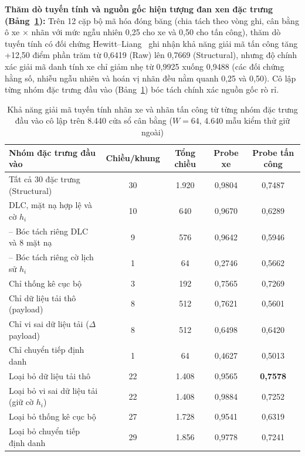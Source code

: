 \documentclass[12pt, a4paper, reqno, oneside]{book}
\begin{document}
\textbf{Thăm dò tuyến tính và nguồn gốc hiện tượng đan xen đặc trưng (Bảng~\ref{tab:input-probes}):} Trên 12 cặp bộ mã hóa đóng băng (chia tách theo vòng ghi, cân bằng ô xe $\times$ nhãn với mức ngẫu nhiên 0,25 cho xe và 0,50 cho tấn công), thăm dò tuyến tính có đối chứng Hewitt--Liang~\cite{hewitt2019probes} ghi nhận khả năng giải mã tấn công tăng +12,50 điểm phần trăm từ 0,6419 (Raw) lên 0,7669 (Structural), nhưng độ chính xác giải mã danh tính xe chỉ giảm nhẹ từ 0,9925 xuống 0,9488 (các đối chứng hằng số, nhiễu ngẫu nhiên và hoán vị nhãn đều nằm quanh 0,25 và 0,50). Cô lập từng nhóm đặc trưng đầu vào (Bảng~\ref{tab:input-probes}) bóc tách chính xác nguồn gốc rò rỉ.

\begin{table}[htbp]
  \centering
  \caption[Khả năng giải mã tuyến tính nhãn xe và tấn công theo từng nhóm đặc trưng đầu vào]{Khả năng giải mã tuyến tính nhãn xe và nhãn tấn công từ từng nhóm đặc trưng đầu vào cô lập trên 8.440 cửa sổ cân bằng ($W=64$, 4.640 mẫu kiểm thử giữ ngoài)}
  \label{tab:input-probes}
  \footnotesize
  \begin{tabular}{@{}l c c c c@{}}
    \toprule
    \textbf{Nhóm đặc trưng đầu vào} & \textbf{Chiều/khung} & \textbf{Tổng chiều} & \textbf{Probe xe} & \textbf{Probe tấn công} \\
    \midrule
    Tất cả 30 đặc trưng (Structural) & 30 & 1.920 & 0,9804 & 0,7487 \\
    DLC, mặt nạ hợp lệ và cờ $h_i$ & 10 & 640 & 0,9670 & 0,6289 \\
    \quad -- Bóc tách riêng DLC và 8 mặt nạ & 9 & 576 & 0,9642 & 0,5946 \\
    \quad -- Bóc tách riêng cờ lịch sử $h_i$ & 1 & 64 & 0,2746 & 0,5662 \\
    Chỉ thống kê cục bộ & 3 & 192 & 0,7565 & 0,7269 \\
    Chỉ dữ liệu tải thô (payload) & 8 & 512 & 0,7621 & 0,5601 \\
    Chỉ vi sai dữ liệu tải ($\Delta$payload) & 8 & 512 & 0,6498 & 0,6420 \\
    Chỉ chuyển tiếp định danh & 1 & 64 & 0,4627 & 0,5013 \\
    Loại bỏ dữ liệu tải thô & 22 & 1.408 & 0,9565 & \textbf{0,7578} \\
    Loại bỏ vi sai dữ liệu tải (giữ cờ $h_i$) & 22 & 1.408 & 0,9884 & 0,7252 \\
    Loại bỏ thống kê cục bộ & 27 & 1.728 & 0,9541 & 0,6319 \\
    Loại bỏ chuyển tiếp định danh & 29 & 1.856 & 0,9778 & 0,7241 \\
    \bottomrule
  \end{tabular}
\end{table}
\end{document}
